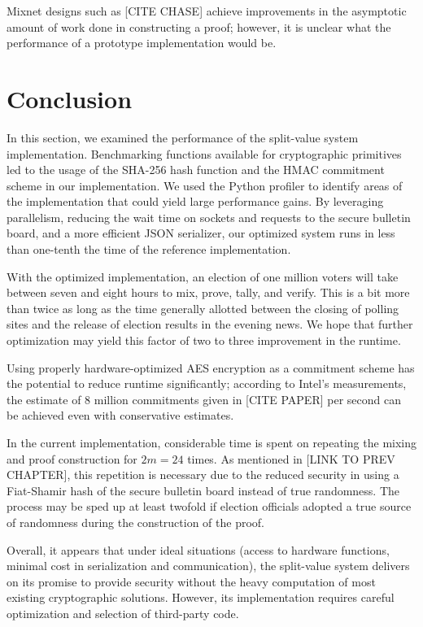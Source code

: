 Mixnet designs such as [CITE CHASE] achieve improvements in the asymptotic amount of work done in constructing a proof; however, it is unclear what the performance of a prototype implementation would be.

\section{Conclusion}

In this section, we examined the performance of the split-value system implementation. Benchmarking functions available for cryptographic primitives led to the usage of the SHA-256 hash function and the HMAC commitment scheme in our implementation. We used the Python profiler to identify areas of the implementation that could yield large performance gains. By leveraging parallelism, reducing the wait time on sockets and requests to the secure bulletin board, and a more efficient JSON serializer, our optimized system runs in less than one-tenth the time of the reference implementation.

With the optimized implementation, an election of one million voters will take between seven and eight hours to mix, prove, tally, and verify. This is a bit more than twice as long as the time generally allotted between the closing of polling sites and the release of election results in the evening news. We hope that further optimization may yield this factor of two to three improvement in the runtime.

Using properly hardware-optimized AES encryption as a commitment scheme has the potential to reduce runtime significantly; according to Intel's measurements, the estimate of 8 million commitments given in [CITE PAPER] per second can be achieved even with conservative estimates.

In the current implementation, considerable time is spent on repeating the mixing and proof construction for $2m = 24$ times. As mentioned in [LINK TO PREV CHAPTER], this repetition is necessary due to the reduced security in using a Fiat-Shamir hash of the secure bulletin board instead of true randomness. The process may be sped up at least twofold if election officials adopted a true source of randomness during the construction of the proof.

Overall, it appears that under ideal situations (access to hardware functions, minimal cost in serialization and communication), the split-value system delivers on its promise to provide security without the heavy computation of most existing cryptographic solutions. However, its implementation requires careful optimization and selection of third-party code.
